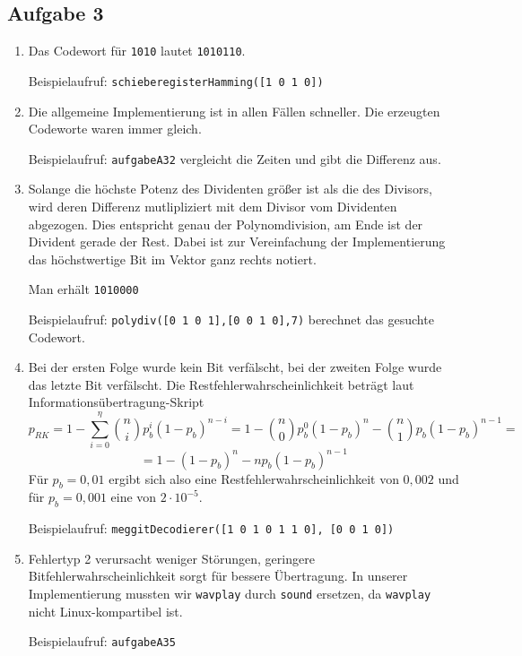 \documentclass[a4paper,10pt]{scrartcl}
\begin{document}
\subsection*{Aufgabe 3}
\begin{enumerate}
 \item Das Codewort für \texttt{1010} lautet \texttt{1010110}.

Beispielaufruf: \texttt{schieberegisterHamming([1 0 1 0])}
 \item Die allgemeine Implementierung ist in allen Fällen schneller. Die erzeugten Codeworte waren immer gleich.

Beispielaufruf: \texttt{aufgabeA32} vergleicht die Zeiten und gibt die Differenz aus.
 \item Solange die höchste Potenz des Dividenten größer ist als die des Divisors, wird deren Differenz mutlipliziert mit dem Divisor vom Dividenten abgezogen. Dies entspricht genau der Polynomdivision, am Ende ist der Divident gerade der Rest. Dabei ist zur Vereinfachung der Implementierung das höchstwertige Bit im Vektor ganz rechts notiert.

Man erhält \texttt{1010000}

Beispielaufruf: \texttt{polydiv([0 1 0 1],[0 0 1 0],7)} berechnet das gesuchte Codewort.
 \item Bei der ersten Folge wurde kein Bit verfälscht, bei der zweiten Folge wurde das letzte Bit verfälscht. Die Restfehlerwahrscheinlichkeit beträgt laut Informationsübertragung-Skript
	\[ p_{RK} = 1 - \sum_{i=0}^\eta { n \choose i } p_b^i(1-p_b)^{n-i} = 1 - { n \choose 0 } p_b^0(1-p_b)^n - { n \choose 1 } p_b (1-p_b)^{n-1} = \]
	\[ = 1 - (1 - p_b)^n - n p_b (1-p_b)^{n-1} \]
	Für \(p_b = 0,01\) ergibt sich also eine Restfehlerwahrscheinlichkeit von \(0,002\) und für \(p_b = 0,001\) eine von \(2 \cdot 10^{-5}\).

Beispielaufruf: \texttt{meggitDecodierer([1 0 1 0 1 1 0], [0 0 1 0])}
 \item Fehlertyp 2 verursacht weniger Störungen, geringere Bitfehlerwahrscheinlichkeit sorgt für bessere Übertragung. In unserer Implementierung mussten wir \texttt{wavplay} durch \texttt{sound} ersetzen, da \texttt{wavplay} nicht Linux-kompartibel ist.

Beispielaufruf: \texttt{aufgabeA35}
\end{enumerate}
\end{document}
